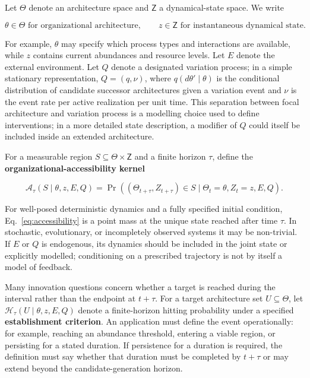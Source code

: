 \documentclass[11pt,a4paper]{article}
\begin{document}
Let $\mathsf\Theta$ denote an architecture space and $\mathsf Z$ a dynamical-state space. We write

\[
\theta\in\mathsf\Theta \text{ for organizational architecture},
\qquad
z\in\mathsf Z \text{ for instantaneous dynamical state}.
\]

For example, $\theta$ may specify which process types and interactions are available, while $z$ contains current abundances and resource levels. Let $E$ denote the external environment. Let $Q$ denote a designated variation process; in a simple stationary representation, $Q=(q,\nu)$, where $q(d\theta'\mid\theta)$ is the conditional distribution of candidate successor architectures given a variation event and $\nu$ is the event rate per active realization per unit time. This separation between focal architecture and variation process is a modelling choice used to define interventions; in a more detailed state description, a modifier of $Q$ could itself be included inside an extended architecture.

For a measurable region $S\subseteq\mathsf\Theta\times\mathsf Z$ and a finite horizon $\tau$, define the \textbf{organizational-accessibility kernel}

\begin{equation}
\boxed{
\mathcal A_\tau(S\mid\theta,z,E,Q)
=
\Pr\!\left(
(\Theta_{t+\tau},Z_{t+\tau})\in S
\mid
\Theta_t=\theta,Z_t=z,E,Q
\right).
}
\label{eq:accessibility}
\end{equation}

For well-posed deterministic dynamics and a fully specified initial condition, Eq.~\eqref{eq:accessibility} is a point mass at the unique state reached after time $\tau$. In stochastic, evolutionary, or incompletely observed systems it may be non-trivial. If $E$ or $Q$ is endogenous, its dynamics should be included in the joint state or explicitly modelled; conditioning on a prescribed trajectory is not by itself a model of feedback.

Many innovation questions concern whether a target is reached during the interval rather than the endpoint at $t+\tau$. For a target architecture set $U\subseteq\mathsf\Theta$, let $\mathcal H_\tau(U\mid\theta,z,E,Q)$ denote a finite-horizon hitting probability under a specified \textbf{establishment criterion}. An application must define the event operationally: for example, reaching an abundance threshold, entering a viable region, or persisting for a stated duration. If persistence for a duration is required, the definition must say whether that duration must be completed by $t+\tau$ or may extend beyond the candidate-generation horizon.
\end{document}
